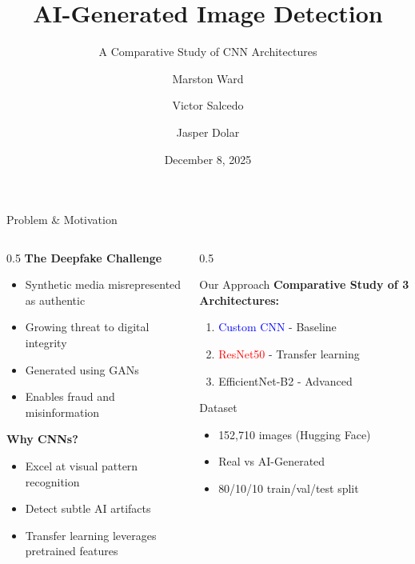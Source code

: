 \documentclass[aspectratio=169]{beamer}
\title[AI-Generated Image Detection]{AI-Generated Image Detection}
\subtitle{A Comparative Study of CNN Architectures}
\author{Marston Ward \and Victor Salcedo \and Jasper Dolar}
\institute[USD]{
    University of San Diego\\
    Applied Artificial Intelligence: Computer Vision
}
\date{December 8, 2025}
\begin{document}
\begin{frame}
    \titlepage
\end{frame}

\begin{frame}{Problem \& Motivation}
    \begin{columns}[T]
        \begin{column}{0.5\textwidth}
            \textbf{The Deepfake Challenge}
            \begin{itemize}
                \item Synthetic media misrepresented as authentic
                \item Growing threat to digital integrity
                \item Generated using GANs
                \item Enables fraud and misinformation
            \end{itemize}
            
            \vspace{0.5cm}
            \textbf{Why CNNs?}
            \begin{itemize}
                \item Excel at visual pattern recognition
                \item Detect subtle AI artifacts
                \item Transfer learning leverages pretrained features
            \end{itemize}
        \end{column}
        
        \begin{column}{0.5\textwidth}
            \begin{block}{Our Approach}
                \textbf{Comparative Study of 3 Architectures:}
                \begin{enumerate}
                    \item \textcolor{blue}{Custom CNN} - Baseline
                    \item \textcolor{red}{ResNet50} - Transfer learning
                    \item \textcolor{green!60!black}{EfficientNet-B2} - Advanced
                \end{enumerate}
            \end{block}
            
            \vspace{0.3cm}
            \begin{block}{Dataset}
                \begin{itemize}
                    \item 152,710 images (Hugging Face)
                    \item Real vs AI-Generated
                    \item 80/10/10 train/val/test split
                \end{itemize}
            \end{block}
        \end{column}
    \end{columns}
\end{frame}
\end{document}
